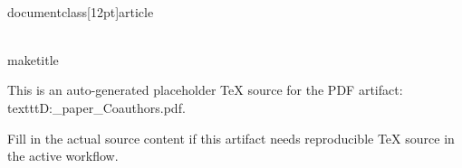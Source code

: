 ﻿\\documentclass[12pt]{article}
\begin{document}
\\maketitle

This is an auto-generated placeholder TeX source for the PDF artifact: \\texttt{D:\working_paper\DANNI\output\doc\coauthor\To_Coauthors.pdf}.

Fill in the actual source content if this artifact needs reproducible TeX source in the active workflow.

\
\end{document}
